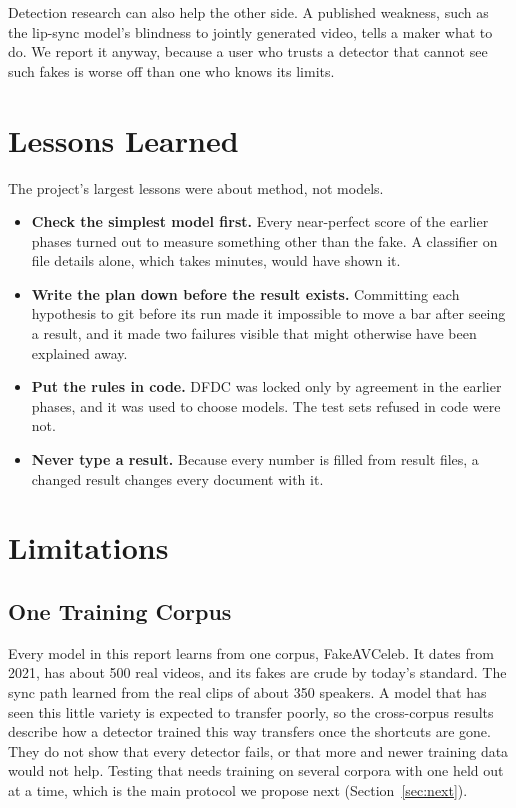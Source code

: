 Detection research can also help the other side. A published weakness, such
as the lip-sync model's blindness to jointly generated video, tells a maker
what to do. We report it anyway, because a user who trusts a detector that
cannot see such fakes is worse off than one who knows its limits.

\section{Lessons Learned}

The project's largest lessons were about method, not models.

\begin{itemize}
    \item \textbf{Check the simplest model first.} Every near-perfect score
    of the earlier phases turned out to measure something other than the fake.
    A classifier on file details alone, which takes minutes, would have shown
    it.
    \item \textbf{Write the plan down before the result exists.} Committing
    each hypothesis to git before its run made it impossible to move a bar
    after seeing a result, and it made two failures visible that might
    otherwise have been explained away.
    \item \textbf{Put the rules in code.} DFDC was locked only by agreement in
    the earlier phases, and it was used to choose models. The test sets refused
    in code were not.
    \item \textbf{Never type a result.} Because every number is filled from
    result files, a changed result changes every document with it.
\end{itemize}

\section{Limitations}
\label{ch:future}

\subsection{One Training Corpus}

Every model in this report learns from one corpus, FakeAVCeleb. It dates from
2021, has about 500 real videos, and its fakes are crude by today's standard.
The sync path learned from the real clips of about 350 speakers. A model that
has seen this little variety is expected to transfer poorly, so the
cross-corpus results describe how a detector trained this way transfers once
the shortcuts are gone. They do not show that every detector fails, or that
more and newer training data would not help. Testing that needs training on
several corpora with one held out at a time, which is the main protocol we
propose next (Section~\ref{sec:next}).

